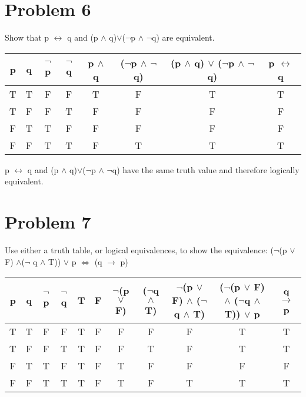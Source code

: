 \documentclass[11pt]{article}
\begin{document}
	\section*{Problem 6}
	Show that p $\leftrightarrow$ q and (p $\wedge$ q)$\vee$($\neg$p $\wedge$ $\neg$q) are equivalent.
	
			\begin{center}
				\begin{tabular}{||c | c | c | c | c | c | c | c||}					\hline
					p & q & $\neg$p & $\neg$q & p $\wedge$ q & ($\neg$p $\wedge$ $\neg$q) & (p $\wedge$ q) $\vee$ ($\neg$p $\wedge$ $\neg$q)& p $\leftrightarrow$ q\\
					[0.5ex]
					\hline\hline
					T & T & F & F & T & F & T & T\\
					\hline		
					T & F & F & T & F & F & F & F\\
					\hline
					F & T & T & F & F & F & F & F\\
					\hline
					F & F & T & T & F & T & T & T\\
					\hline			
				\end{tabular}
			\end{center}
			
			p $\leftrightarrow$ q and (p $\wedge$ q)$\vee$($\neg$p $\wedge$ $\neg$q) have the same truth value and therefore logically equivalent.\\
			\newpage
		
	\section*{Problem 7}
	Use either a truth table, or logical equivalences, to show the equivalence:\newline
	($\neg$(p $\vee$ F) $\wedge$($\neg$ q $\wedge$ T)) $\vee$ p $\Leftrightarrow$ (q $\rightarrow$ p)
	
		
		\begin{center}
			\begin{tabular}{||c | c | c | c | c | c | c | c | c | c | c ||}					\hline
				p & q & $\neg$p & $\neg$q & T & F & $\neg$(p $\vee$ F) & ($\neg$q $\wedge$ T) & $\neg$(p $\vee$ F) $\wedge$ ($\neg$q $\wedge$ T) & ($\neg$(p $\vee$ F) $\wedge$ ($\neg$q $\wedge$ T)) $\vee$ p & q $\rightarrow$ p\\
				[0.5ex]
				\hline\hline
				T & T & F & F & T & F & F & F & F  & T & T\\
				\hline		
				T & F & F & T & T & F & F & T & F & T & T\\
				\hline
				F & T & T & F & T & F & T & F & F & F & F\\
				\hline
				F & F & T & T & T & F & T & F & T & T & T\\
				\hline			
			\end{tabular}
		\end{center}
	\newline
\end{document}
